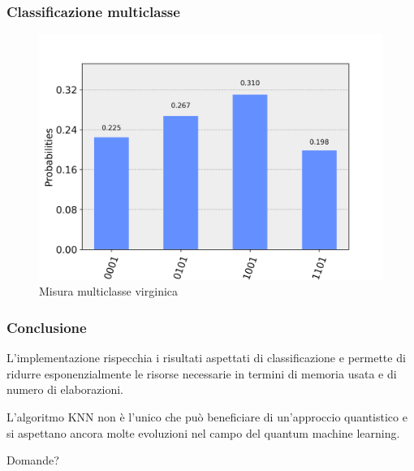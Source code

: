 \documentclass{beamer}
\begin{document}
	\begin{frame}
		\frametitle{Classificazione multiclasse}
	
		\begin{figure}[]
			\centering
			\includegraphics[width=.8\textwidth]{gfx/multiclass_virginica}
			\caption{Misura multiclasse virginica}
			\label{fig:multiclasse}
		\end{figure}
	
	\end{frame}

\begin{frame}
	\frametitle{Conclusione}

	L'implementazione rispecchia i risultati aspettati di classificazione e permette 
	di ridurre esponenzialmente le risorse necessarie in termini di memoria usata e 
	di numero di elaborazioni. 

	L'algoritmo KNN non è l'unico che può beneficiare di un'approccio quantistico e 
	si aspettano ancora molte evoluzioni nel campo del quantum machine learning. 

\end{frame}

\begin{frame}[focus]
	Domande?
\end{frame}
\end{document}
